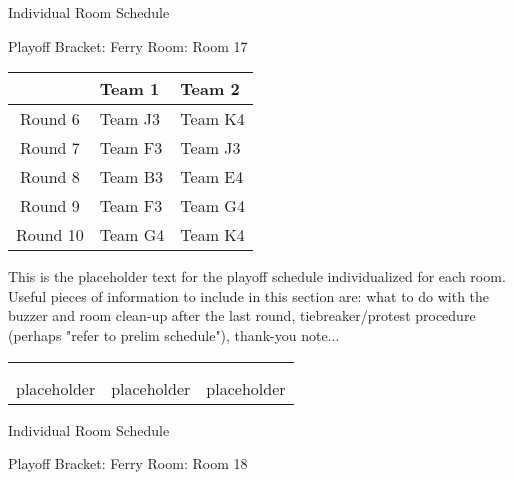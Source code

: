 \documentclass{article}%
\begin{document}
\newpage%
\begin{center}%
\begin{Huge}%
Individual Room Schedule%
\end{Huge}%
\vspace*{16pt}%
\linebreak%
\begin{Large}%
Playoff Bracket: Ferry \hfill Room: Room 17%
\end{Large}%
\end{center}%
%
\begin{tabularx}{\textwidth}{|c|Y|Y|}%
\hline%
&Team 1&Team 2\\%
\hline%
Round 6&Team J3&Team K4\\%
Round 7&Team F3&Team J3\\%
Round 8&Team B3&Team E4\\%
Round 9&Team F3&Team G4\\%
Round 10&Team G4&Team K4\\%
\hline%
\end{tabularx}%
\vspace*{16pt}%
\linebreak%
This is the placeholder text for the playoff schedule individualized for each room. Useful pieces of information to include in this section are: what to do with the buzzer and room clean{-}up after the last round, tiebreaker/protest procedure (perhaps "refer to prelim schedule"), thank{-}you note...%
\vspace*{30pt}%
\newline%
%
\begin{tabularx}{\textwidth}{YYY}%
  &  &  \\%
\\%
placeholder&placeholder&placeholder\\%
\end{tabularx}%
\newpage%
\begin{center}%
\begin{Huge}%
Individual Room Schedule%
\end{Huge}%
\vspace*{16pt}%
\linebreak%
\begin{Large}%
Playoff Bracket: Ferry \hfill Room: Room 18%
\end{Large}%
\end{center}%
\end{document}
